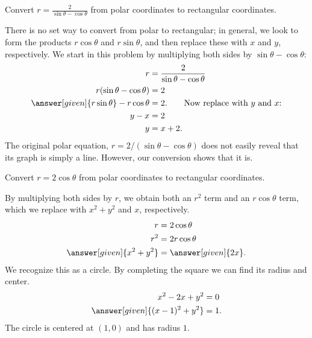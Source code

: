 \documentclass{ximera}
\begin{document}
\begin{example}
   Convert $r=\frac{2}{\sin \theta-\cos\theta}$ from polar coordinates
   to rectangular coordinates.
   \begin{explanation}
     There is no set way to convert from polar to rectangular; in
     general, we look to form the products $r\cos \theta$ and
     $r\sin\theta$, and then replace these with $x$ and $y$,
     respectively. We start in this problem by multiplying both sides
     by $\sin\theta-\cos\theta$:
     \begin{align*}
       r &= \frac{2}{\sin\theta-\cos\theta} \\
       r(\sin\theta-\cos\theta) &= 2\\
       \answer[given]{r\sin\theta}-r\cos\theta &= 2. \qquad \text{Now replace with $y$ and $x$:}\\
       y-x &= 2\\
	  y &= x+2.
     \end{align*}
     The original polar equation, $r=2/(\sin\theta-\cos\theta)$ does
     not easily reveal that its graph is simply a line. However, our
     conversion shows that it is.
   \end{explanation}
\end{example}

\begin{example}
   Convert $r =2\cos \theta$ from polar coordinates to rectangular
   coordinates.        	
   \begin{explanation}
     By multiplying both sides by $r$, we obtain both an $r^2$ term
     and an $r\cos\theta$ term, which we replace with $x^2+y^2$ and
     $x$, respectively.
     \begin{align*}
       r &=2\cos\theta \\
       r^2 &= 2r\cos\theta \\
       \answer[given]{x^2+y^2} &= \answer[given]{2x}. 
     \end{align*}
     We recognize this as a circle. By completing the square we can
     find its radius and center.
     \begin{align*}
       x^2-2x+y^2 &= 0 \\
       \answer[given]{(x-1)^2 + y^2} &=1.
     \end{align*}
     The circle is centered at $(1,0)$ and has radius $1$.
   \end{explanation}
 \end{example}
\end{document}

